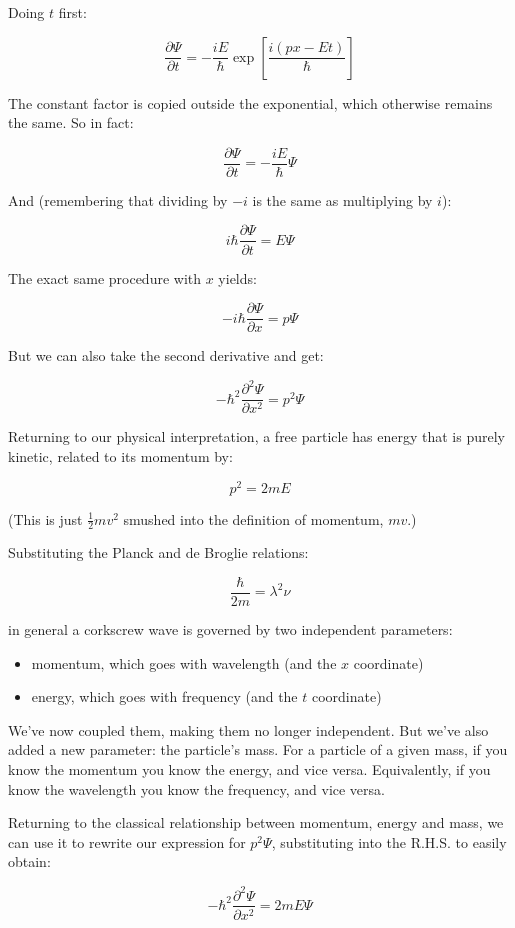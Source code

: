 Doing $t$ first:

$$
\frac{\partial \Psi}{\partial t}
=
-\frac{iE}{\hbar}
\exp \left[ {\frac{i(px - Et)}{\hbar}} \right]
$$

The constant factor is copied outside the exponential, which otherwise remains the same. So in fact:

$$
\frac{\partial \Psi}{\partial t}
=
-\frac{iE}{\hbar}
\Psi
$$

And (remembering that dividing by $-i$ is the same as multiplying by $i$):

$$
i\hbar \frac{\partial \Psi}{\partial t}
= E \Psi
$$

The exact same procedure with $x$ yields:

$$
- i\hbar \frac{\partial \Psi}{\partial x}
= p \Psi
$$

But we can also take the second derivative and get:

$$
- \hbar^2 \frac{\partial^2 \Psi}{\partial x^2}
= p^2 \Psi
$$

Returning to our physical interpretation, a free particle has energy that is purely kinetic, related to its momentum by:

$$
p^2 = 2m E
$$

(This is just $\frac{1}{2}mv^2$ smushed into the definition of momentum, $mv$.)

Substituting the Planck and de Broglie relations:

$$
\frac{\hbar}{2m} = \lambda^2\nu
$$

in general a corkscrew wave is governed by two independent parameters:

\begin{itemize}
  \item momentum, which goes with wavelength (and the $x$ coordinate)
  \item energy, which goes with frequency (and the $t$ coordinate)
\end{itemize}

We've now coupled them, making them no longer independent. But we've also added a new parameter: the particle's mass. For a particle of a given mass, if you know the momentum you know the energy, and vice versa. Equivalently, if you know the wavelength you know the frequency, and vice versa.

Returning to the classical relationship between momentum, energy and mass, we can use it to rewrite our expression for $p^2 \Psi$, substituting into the R.H.S. to easily obtain:

$$
- \hbar^2 \frac{\partial^2 \Psi}{\partial x^2}
= 2mE\Psi
$$


